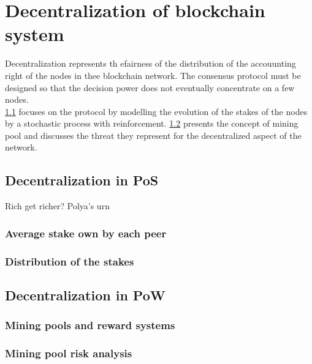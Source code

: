 \chapter{Decentralization of blockchain system}\label{chap:decentralization}
Decentralization represents th efairness of the distribution of the accouunting right of the nodes in thee blockchain network. The consensus protocol must be designed so that the decision power does not eventually concentrate on a few nodes.\\

\noindent \cref{sec:decentralization_pos} focuses on the \PoS protocol by modelling the evolution of the stakes of the nodes by a stochastic process with reinforcement. \cref{sec:decentralization_pow} presents the concept of mining pool and discusses the threat they represent for the decentralized aspect of the network.

\section{Decentralization in PoS}\label{sec:decentralization_pos}
Rich get richer? Polya's urn
\subsection{Average stake own by each peer}
\subsection{Distribution of the stakes}
\section{Decentralization in PoW}\label{sec:decentralization_pow}
\subsection{Mining pools and reward systems}
\subsection{Mining pool risk analysis}

\newpage